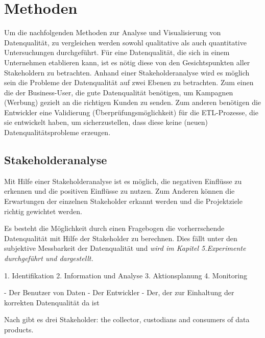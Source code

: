 \chapter{Methoden}\label{ch:method}
Um die nachfolgenden Methoden zur Analyse und Visualisierung von Datenqualität, zu vergleichen werden sowohl qualitative als auch quantitative Untersuchungen durchgeführt.
Für eine Datenqualität, die sich in einem Unternehmen etablieren kann, ist es nötig diese von den Gesichtspunkten aller Stakeholdern zu betrachten.
Anhand einer Stakeholderanalyse wird es möglich sein die Probleme der Datenqualität auf zwei Ebenen zu betrachten. 
Zum einen die der Business-User, die gute Datenqualität benötigen, um Kampagnen (Werbung) gezielt an die richtigen Kunden zu senden.
Zum anderen benötigen die Entwickler eine Validierung (Überprüfungsmöglichkeit) für die ETL-Prozesse, die sie entwickelt haben, um sicherzustellen, dass diese keine (neuen) Datenqualitätsprobleme erzeugen. 


\section{Stakeholderanalyse}
Mit Hilfe einer Stakeholderanalyse ist es möglich, die negativen Einflüsse zu erkennen und die positiven Einflüsse zu nutzen.
Zum Anderen können die Erwartungen der einzelnen Stakeholder erkannt werden und die Projektziele richtig gewichtet werden. 

Es besteht die Möglichkeit durch einen Fragebogen die vorherrschende Datenqualität mit Hilfe der Stakeholder zu berechnen. \cite{pipino2002}
Dies fällt unter den subjektive Messbarkeit der Datenqualität und \textit{wird im Kapitel 5.Experimente durchgeführt und dargestellt.}

1. Identifikation
2. Information und Analyse
3. Aktionsplanung
4. Monitoring


- Der Benutzer von Daten
- Der Entwickler
- Der, der zur Einhaltung der korrekten Datenqualität da ist


Nach \cite{pipino2002} gibt es drei Stakeholder: the collector, custodians and consumers of data products.  

